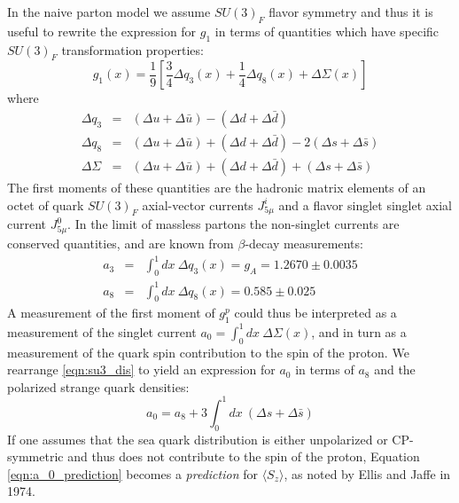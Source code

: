 In the naive parton model we assume $SU(3)_F$ flavor symmetry and thus it is useful to rewrite the expression for $g_1$ in terms of quantities which have specific $SU(3)_F$ transformation properties:
%
\begin{equation}
  g_1(x) = \frac{1}{9}[\frac{3}{4}\Delta q_3(x) + \frac{1}{4}\Delta q_8(x) + \Delta \Sigma(x)]
\end{equation}
%
where
%
\begin{eqnarray}
  \Delta q_3 & = & (\Delta u + \Delta \bar{u}) - (\Delta d + \Delta \bar{d}) \nonumber \\
  \Delta q_8 & = & (\Delta u + \Delta \bar{u}) + (\Delta d + \Delta \bar{d}) - 2(\Delta s + \Delta \bar{s}) \nonumber \\
  \Delta \Sigma & = & (\Delta u + \Delta \bar{u}) + (\Delta d + \Delta \bar{d}) + (\Delta s + \Delta \bar{s})
  \label{eqn:su3_dis}
\end{eqnarray}
%
The first moments of these quantities are the hadronic matrix elements of an octet of quark $SU(3)_F$ axial-vector currents $J_{5\mu}^i$ and a flavor singlet singlet axial current $J_{5\mu}^0$.  In the limit of massless partons the non-singlet currents are conserved quantities, and are known from $\beta$-decay measurements:
%
\begin{eqnarray}
  a_3 & = & \int_0^1 dx~\Delta q_3(x) = g_A = 1.2670 \pm 0.0035 \nonumber \\
  a_8 & = & \int_0^1 dx~\Delta q_8(x) = 0.585 \pm 0.025
\end{eqnarray}
%
A measurement of the first moment of $g_1^p$ could thus be interpreted as a measurement of the singlet current $a_0 = \int_0^1 dx~\Delta \Sigma (x)$, and in turn as a measurement of the quark spin contribution to the spin of the proton.  We rearrange \ref{eqn:su3_dis} to yield an expression for $a_0$ in terms of $a_8$ and the polarized strange quark densities:
%
\begin{equation}
  a_0 = a_8 + 3 \int_0^1 dx~(\Delta s + \Delta \bar s)
  \label{eqn:a_0_prediction}
\end{equation}
%
If one assumes that the sea quark distribution is either unpolarized or CP-symmetric and thus does not contribute to the spin of the proton, Equation \ref{eqn:a_0_prediction} becomes a \textit{prediction} for $\langle S_z \rangle$, as noted by Ellis and Jaffe \cite{Ellis:1973kp} in 1974.


